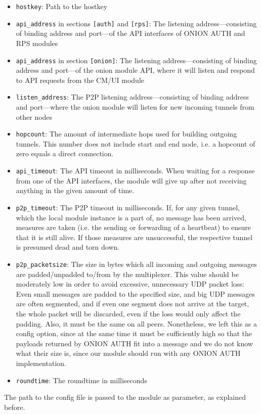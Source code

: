\documentclass{article}
\begin{document}
\begin{itemize}
\item \texttt{hostkey}: Path to the hostkey
\item \texttt{api\_address} in sections \texttt{[auth]} and \texttt{[rps]}: The listening address---consisting of binding address and port---of the API interfaces of ONION AUTH and RPS modules
\item \texttt{api\_address} in section \texttt{[onion]}: The listening address---consisting of binding address and port---of the onion module API, where it will listen and respond to API requests from the CM/UI module
\item \texttt{listen\_address}: The P2P listening address---consisting of binding address and port---where the onion module will listen for new incoming tunnels from other nodes
\item \texttt{hopcount}: The amount of intermediate hops used for building outgoing tunnels. This number does not include start and end node, i.e. a hopcount of zero equals a direct connection.
\item \texttt{api\_timeout}: The API timeout in milliseconds. When waiting for a response from one of the API interfaces, the module will give up after not receiving anything in the given amount of time.
\item \texttt{p2p\_timeout}: The P2P timeout in milliseconds. If, for any given tunnel, which the local module instance is a part of, no message has been arrived, measures are taken (i.e. the sending or forwarding of a heartbeat) to ensure that it is still alive. If those measures are unsuccessful, the respective tunnel is presumed dead and torn down.
\item \texttt{p2p\_packetsize}: The size in bytes which all incoming and outgoing messages are padded/unpadded to/from by the multiplexer. This value should be moderately low in order to avoid excessive, unnecessary UDP packet loss: Even small messages are padded to the specified size, and big UDP messages are often segmented, and if even one segment does not arrive at the target, the whole packet will be discarded, even if the loss would only affect the padding. Also, it must be the same on all peers. Nonetheless, we left this as a config option, since at the same time it must be sufficiently high so that the payloads returned by ONION AUTH fit into a message and we do not know what their size is, since our module should run with any ONION AUTH implementation.
\item \texttt{roundtime}: The roundtime in milliseconds
\end{itemize}
The path to the config file is passed to the module as parameter, as explained before.
	
\end{document}
